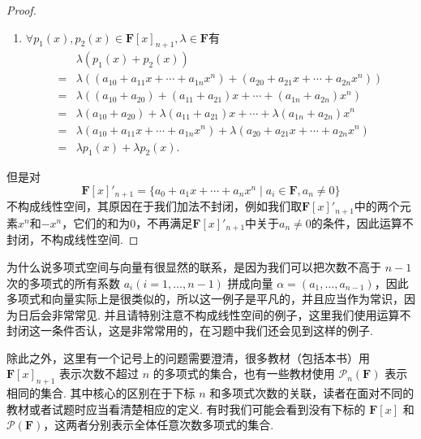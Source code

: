 \begin{proof}
\begin{enumerate}
        \item $\forall p_1(x), p_2(x) \in \mathbf{F}[x]_{n+1}, \lambda \in \mathbf{F}$有
              \begin{align*}
                      & \lambda(p_1(x) + p_2(x))                                                                        \\
                  ={} & \lambda((a_{10} + a_{11}x + \cdots + a_{1n}x^n) + (a_{20} + a_{21}x + \cdots + a_{2n}x^n))      \\
                  ={} & \lambda((a_{10} + a_{20}) + (a_{11} + a_{21})x + \cdots + (a_{1n} + a_{2n})x^n)                 \\
                  ={} & \lambda(a_{10} + a_{20}) + \lambda(a_{11} + a_{21})x + \cdots + \lambda(a_{1n} + a_{2n})x^n     \\
                  ={} & \lambda(a_{10} + a_{11}x + \cdots + a_{1n}x^n) + \lambda(a_{20} + a_{21}x + \cdots + a_{2n}x^n) \\
                  ={} & \lambda p_1(x) + \lambda p_2(x).
              \end{align*}
    \end{enumerate}
    但是对\[\mathbf{F}[x]'_{n+1}=\{a_0+a_1x+\cdots+a_nx^n \mid a_i\in\mathbf{F}, a_n\neq 0\}\]不构成线性空间，其原因在于我们加法不封闭，例如我们取$\mathbf{F}[x]'_{n+1}$中的两个元素$x^n$和$-x^n$，它们的和为$0$，不再满足$\mathbf{F}[x]'_{n+1}$中关于$a_n\neq 0$的条件，因此运算不封闭，不构成线性空间.
\end{proof}

为什么说多项式空间与向量有很显然的联系，是因为我们可以把次数不高于 $n-1$ 次的多项式的所有系数 $a_i(i=1,\ldots,n-1)$ 拼成向量 $\alpha=(a_1,\ldots,a_{n-1})$，因此多项式和向量实际上是很类似的，所以这一例子是平凡的，并且应当作为常识，因为日后会非常常见. 并且请特别注意不构成线性空间的例子，这里我们使用运算不封闭这一条件否认，这是非常常用的，在习题中我们还会见到这样的例子.

除此之外，这里有一个记号上的问题需要澄清，很多教材（包括本书）用 $\mathbf{F}[x]_{n+1}$ 表示次数不超过 $n$ 的多项式的集合，也有一些教材使用 $\mathcal{P}_n(\mathbf{F})$ 表示相同的集合. 其中核心的区别在于下标 $n$ 和多项式次数的关联，读者在面对不同的教材或者试题时应当看清楚相应的定义. 有时我们可能会看到没有下标的 $\mathbf{F}[x]$ 和 $\mathcal{P}(\mathbf{F})$，这两者分别表示全体任意次数多项式的集合.


